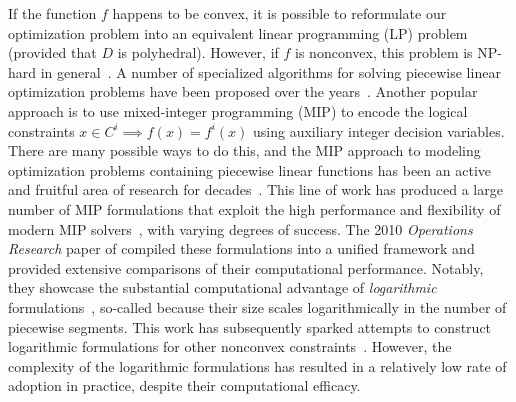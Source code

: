 \documentclass[opre,nonblindrev]{informs3} %
\begin{document}
If the function $f$ happens to be convex, it is possible to reformulate our optimization problem into an equivalent linear programming (LP) problem (provided that $D$ is polyhedral). However, if $f$ is nonconvex, this problem is NP-hard in general~\citep{Keha:2006}. A number of specialized algorithms for solving piecewise linear optimization problems have been proposed over the years~\citep{Beale:1970,Farias-Jr.:2008,Farias-Jr.:2013,Keha:2006,Tomlin:1981}. Another popular approach is to use mixed-integer programming (MIP) to encode the logical constraints $x \in C^i \implies f(x) = f^i(x)$ using auxiliary integer decision variables. There are many possible ways to do this, and the MIP approach to modeling optimization problems containing piecewise linear functions has been an active and fruitful area of research for decades~\citep{Balakrishnan:1989,Croxton:2003,DAmbrosio:2010,Dantzig:1960,Jeroslow:1984,Jeroslow:1985a,Keha:2004,Lee:2001,Magnanti:2004,Markowitz:1957,Padberg:2000,Sherali:2001,Vielma:2009a,Vielma:2010,Wilson:1998}. This line of work has produced a large number of MIP formulations that exploit the high performance and flexibility of modern MIP solvers~\citep{Bixby:2007,Junger:2010}, with varying degrees of success. The 2010 \emph{Operations Research} paper of \cite{Vielma:2010} compiled these formulations into a unified framework and provided extensive comparisons of their computational performance. Notably, they showcase the substantial computational advantage of \emph{logarithmic} formulations~\citep{Vielma:2009a}, so-called because their size scales logarithmically in the number of piecewise segments. This work has subsequently sparked attempts to construct logarithmic formulations for other nonconvex constraints~\citep{Huchette:2016a,Huchette:2015,Vielma:2016}. However, the complexity of the logarithmic formulations has resulted in a relatively low rate of adoption in practice, despite their computational efficacy.
\end{document}
